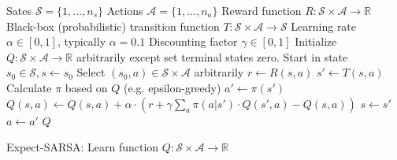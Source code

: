 \documentclass{article}
\begin{document}
\begin{preview}
	\begin{algorithm}[H]
		\begin{algorithmic}
			\Require
			\Statex Sates $\mathcal{S} = \{1, \dots, n_s\}$
			\Statex Actions $\mathcal{A} = \{1, \dots, n_a\}$
			\Statex Reward function $R: \mathcal{S} \times \mathcal{A} \rightarrow \mathbb{R}$
			\Statex Black-box (probabilistic) transition function $T: \mathcal{S} \times \mathcal{A} \rightarrow \mathcal{S}$
			\Statex Learning rate $\alpha \in [0, 1]$, typically $\alpha = 0.1$
			\Statex Discounting factor $\gamma \in [0, 1]$
			\State Initialize $Q: \mathcal{S} \times \mathcal{A} \rightarrow \mathbb{R}$ arbitrarily except set terminal states zero.
			\State Start in state $s_0 \in \mathcal{S}, s \gets s_0$
			\State Select $(s_0, a) \in \mathcal{S} \times \mathcal{A}$ arbitrarily
			\State $r \gets R(s, a)$ 
			\State $s' \gets T(s, a)$ 
			\State Calculate $\pi$ based on $Q$ (e.g. epsilon-greedy)
			\State $a' \gets \pi(s')$
            \State $Q(s, a) \gets  Q(s, a) + \alpha \cdot (r + \gamma \sum_a \pi(a | s') \cdot Q(s', a)- Q(s, a))$
			\State $s \gets s'$
			\State $a \gets a'$
			\EndWhile
			\EndWhile
			\Return $Q$
			\EndProcedure
		\end{algorithmic}
		\caption{Expect-SARSA: Learn function $Q: \mathcal{S} \times \mathcal{A} \rightarrow \mathbb{R}$}
		\label{alg:expect-sarsa}
	\end{algorithm}
\end{preview}
\end{document}
